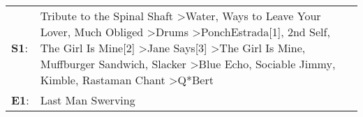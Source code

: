 \begin{supertabular}{p{0.03\textwidth}p{0.92\textwidth}}
 \textbf{S1}:  &  Tribute to the Spinal Shaft\textsuperscript{} \textgreater \enspace Water\textsuperscript{},  Ways to Leave Your Lover\textsuperscript{}, \enspace Much Obliged\textsuperscript{} \textgreater \enspace Drums\textsuperscript{} \textgreater \enspace PonchEstrada[1]\textsuperscript{}, \enspace 2nd Self\textsuperscript{}, \enspace The Girl Is Mine[2]\textsuperscript{} \textgreater \enspace Jane Says[3]\textsuperscript{} \textgreater \enspace The Girl Is Mine\textsuperscript{}, \enspace Muffburger Sandwich\textsuperscript{}, \enspace Slacker\textsuperscript{} \textgreater \enspace Blue Echo\textsuperscript{}, \enspace Sociable Jimmy\textsuperscript{}, \enspace Kimble\textsuperscript{}, \enspace Rastaman Chant\textsuperscript{} \textgreater \enspace Q*Bert\textsuperscript{}  \enspace  \\
 \textbf{E1}:  &                                                                                                                                                                                                                                                                                                                                                                                                                                                                                                                                                                                                                                                                                                                                                                                  Last Man Swerving\textsuperscript{}  \enspace  \\
\end{supertabular}
